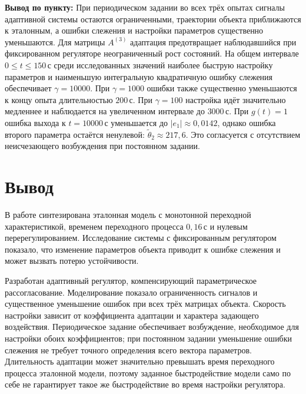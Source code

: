 \noindent\textbf{Вывод по пункту:} При периодическом задании во всех трёх
опытах сигналы адаптивной системы остаются ограниченными, траектории
объекта приближаются к эталонным, а ошибки слежения и настройки
параметров существенно уменьшаются. Для матрицы $A^{(3)}$ адаптация
предотвращает наблюдавшийся при фиксированном регуляторе неограниченный
рост состояний. На общем интервале $0\le t\le150\,\text{с}$
среди исследованных значений наиболее быструю настройку параметров
и наименьшую интегральную квадратичную ошибку слежения обеспечивает
$\gamma=10000$. При $\gamma=1000$ ошибки также существенно уменьшаются
к концу опыта длительностью $200\,\text{с}$.
При $\gamma=100$ настройка идёт значительно медленнее и наблюдается
на увеличенном интервале до $3000\,\text{с}$.
При $g(t)=1$ ошибка выхода к $t=10000\,\text{с}$ уменьшается
до $|e_1|\approx0{,}0142$, однако ошибка второго параметра
остаётся ненулевой: $\tilde\theta_2\approx217{,}6$.
Это согласуется с отсутствием неисчезающего возбуждения
при постоянном задании.

\section{Вывод}

В работе синтезирована эталонная модель с монотонной переходной
характеристикой, временем переходного процесса $0{,}16\,\text{с}$
и нулевым перерегулированием. Исследование системы с фиксированным
регулятором показало, что изменение параметров объекта приводит
к ошибке слежения и может вызвать потерю устойчивости.

Разработан адаптивный регулятор, компенсирующий параметрическое
рассогласование. Моделирование показало ограниченность сигналов
и существенное уменьшение ошибок при всех трёх матрицах объекта.
Скорость настройки зависит от коэффициента адаптации
и характера задающего воздействия. Периодическое задание обеспечивает
возбуждение, необходимое для настройки обоих коэффициентов;
при постоянном задании уменьшение ошибки слежения не требует
точного определения всего вектора параметров. Длительность адаптации
может значительно превышать время переходного процесса эталонной
модели, поэтому заданное быстродействие модели само по себе
не гарантирует такое же быстродействие во время настройки регулятора.

